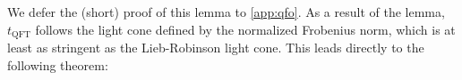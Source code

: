 We defer the (short) proof of this lemma to \cref{app:qfo}.
As a result of the lemma, $t_\mathrm{QFT}$ follows the light cone defined by the normalized Frobenius norm, which is at least as stringent as the Lieb-Robinson light cone.
This leads directly to the following theorem:
%

